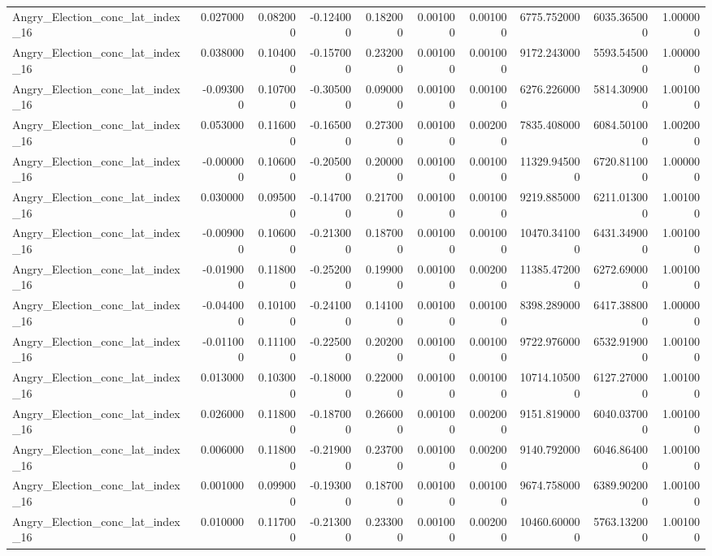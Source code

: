 \begin{table}
\begin{tabular}{lrrrrrrrrr}
Angry_Election_conc_lat_index_16 & 0.027000 & 0.082000 & -0.124000 & 0.182000 & 0.001000 & 0.001000 & 6775.752000 & 6035.365000 & 1.000000 \\
Angry_Election_conc_lat_index_16 & 0.038000 & 0.104000 & -0.157000 & 0.232000 & 0.001000 & 0.001000 & 9172.243000 & 5593.545000 & 1.000000 \\
Angry_Election_conc_lat_index_16 & -0.093000 & 0.107000 & -0.305000 & 0.090000 & 0.001000 & 0.001000 & 6276.226000 & 5814.309000 & 1.001000 \\
Angry_Election_conc_lat_index_16 & 0.053000 & 0.116000 & -0.165000 & 0.273000 & 0.001000 & 0.002000 & 7835.408000 & 6084.501000 & 1.002000 \\
Angry_Election_conc_lat_index_16 & -0.000000 & 0.106000 & -0.205000 & 0.200000 & 0.001000 & 0.001000 & 11329.945000 & 6720.811000 & 1.000000 \\
Angry_Election_conc_lat_index_16 & 0.030000 & 0.095000 & -0.147000 & 0.217000 & 0.001000 & 0.001000 & 9219.885000 & 6211.013000 & 1.001000 \\
Angry_Election_conc_lat_index_16 & -0.009000 & 0.106000 & -0.213000 & 0.187000 & 0.001000 & 0.001000 & 10470.341000 & 6431.349000 & 1.001000 \\
Angry_Election_conc_lat_index_16 & -0.019000 & 0.118000 & -0.252000 & 0.199000 & 0.001000 & 0.002000 & 11385.472000 & 6272.690000 & 1.001000 \\
Angry_Election_conc_lat_index_16 & -0.044000 & 0.101000 & -0.241000 & 0.141000 & 0.001000 & 0.001000 & 8398.289000 & 6417.388000 & 1.000000 \\
Angry_Election_conc_lat_index_16 & -0.011000 & 0.111000 & -0.225000 & 0.202000 & 0.001000 & 0.001000 & 9722.976000 & 6532.919000 & 1.001000 \\
Angry_Election_conc_lat_index_16 & 0.013000 & 0.103000 & -0.180000 & 0.220000 & 0.001000 & 0.001000 & 10714.105000 & 6127.270000 & 1.001000 \\
Angry_Election_conc_lat_index_16 & 0.026000 & 0.118000 & -0.187000 & 0.266000 & 0.001000 & 0.002000 & 9151.819000 & 6040.037000 & 1.001000 \\
Angry_Election_conc_lat_index_16 & 0.006000 & 0.118000 & -0.219000 & 0.237000 & 0.001000 & 0.002000 & 9140.792000 & 6046.864000 & 1.001000 \\
Angry_Election_conc_lat_index_16 & 0.001000 & 0.099000 & -0.193000 & 0.187000 & 0.001000 & 0.001000 & 9674.758000 & 6389.902000 & 1.001000 \\
Angry_Election_conc_lat_index_16 & 0.010000 & 0.117000 & -0.213000 & 0.233000 & 0.001000 & 0.002000 & 10460.600000 & 5763.132000 & 1.001000 \\

\end{tabular}
\end{table}
